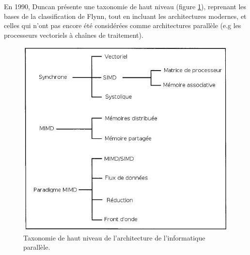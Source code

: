\documentclass[a4paper,12pt]{report}
\theoremstyle{plain}				%
\theoremstyle{definition}				%
\newcommand{\lp}[1]{\todo[author=LP,color=yellow,inline]{#1}}
\newcommand{\fco}[1]{\todo[author=FCO,color=blue,inline]{#1}}
\begin{document}
En 1990, Duncan présente une taxonomie de haut niveau \cite{44900} 
(figure \ref{fig:TaxonomieHautNiveau}), 
reprenant les bases de la classification de Flynn, tout en incluant 
les architectures modernes, et celles qui n'ont pas encore été 
considérées comme architectures parallèle (e.g les processeurs 
vectoriels à chaînes de traitement).

\begin{figure}
\includegraphics[width=\columnwidth]{Biblio_PCmax_Rendu_Taxonomie_Duncan.jpg}
\caption{Taxonomie de haut niveau de l'architecture de l'informatique parallèle.}
\label{fig:TaxonomieHautNiveau}
\end{figure}
\end{document}
